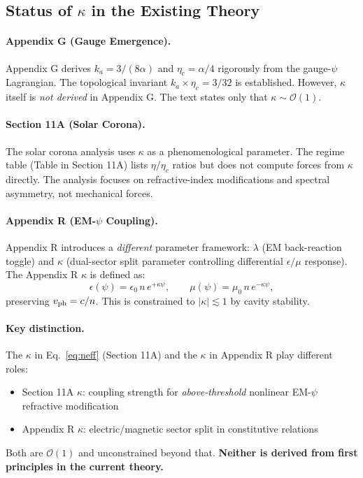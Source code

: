 \documentclass[12pt,a4paper]{article}
\begin{document}
\subsection{Status of $\kappa$ in the Existing Theory}

\paragraph{Appendix G (Gauge Emergence).}
Appendix G derives $k_a = 3/(8\alpha)$ and $\eta_c = \alpha/4$ rigorously from
the gauge-$\psi$ Lagrangian.  The topological invariant $k_a \times \eta_c = 3/32$
is established.  However, $\kappa$ itself is \emph{not derived} in Appendix G.
The text states only that $\kappa \sim \mathcal{O}(1)$.

\paragraph{Section 11A (Solar Corona).}
The solar corona analysis uses $\kappa$ as a phenomenological parameter.
The regime table (Table in Section 11A) lists $\eta/\eta_c$ ratios but does
not compute forces from $\kappa$ directly.  The analysis focuses on
refractive-index modifications and spectral asymmetry, not mechanical forces.

\paragraph{Appendix R (EM-$\psi$ Coupling).}
Appendix R introduces a \emph{different} parameter framework: $\lambda$
(EM back-reaction toggle) and $\kappa$ (dual-sector split parameter controlling
differential $\epsilon/\mu$ response).  The Appendix R $\kappa$ is defined as:
\begin{equation}
\epsilon(\psi) = \epsilon_0\, n\, e^{+\kappa\psi}, \qquad
\mu(\psi) = \mu_0\, n\, e^{-\kappa\psi},
\end{equation}
preserving $v_{\rm ph} = c/n$.  This is constrained to $|\kappa| \lesssim 1$ by
cavity stability.

\paragraph{Key distinction.}
The $\kappa$ in Eq.~\eqref{eq:neff} (Section 11A) and the $\kappa$ in Appendix R
play different roles:
\begin{itemize}
\item Section 11A $\kappa$: coupling strength for \emph{above-threshold} nonlinear
  EM-$\psi$ refractive modification
\item Appendix R $\kappa$: electric/magnetic sector split in constitutive relations
\end{itemize}
Both are $\mathcal{O}(1)$ and unconstrained beyond that.  \textbf{Neither is derived
from first principles in the current theory.}
\end{document}
